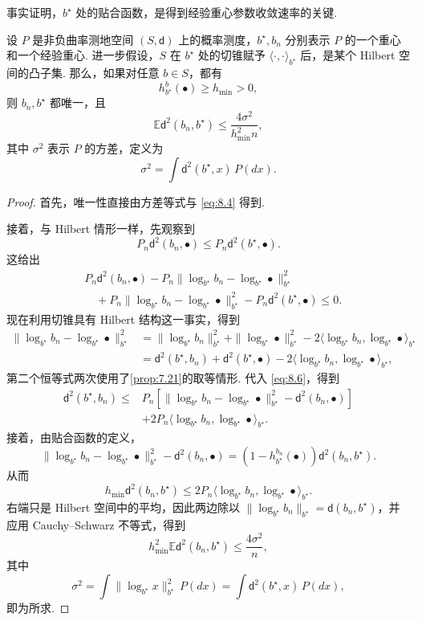 事实证明，$b^\star$ 处的贴合函数，是得到经验重心参数收敛速率的关键.
\begin{theorem}[主定理]\label{thm:8.5}
设 $P$ 是非负曲率测地空间 $(S,\mathsf d)$ 上的概率测度，$b^\star,b_n$ 分别表示 $P$ 的一个重心和一个经验重心. 进一步假设，$S$ 在 $b^\star$ 处的切锥赋予 $\langle\cdot,\cdot\rangle_{b^\star}$ 后，是某个 Hilbert 空间的凸子集. 那么，如果对任意 $b\in S$，都有
\begin{equation}\label{eq:8.4}
h_{b^\star}^b(\bullet)\ge h_{\min}>0,
\end{equation}
则 $b_n,b^\star$ 都唯一，且
$$\mathbb E\mathsf d^2(b_n,b^\star)\le\frac{4\sigma^2}{h_{\min}^2n},$$
其中 $\sigma^2$ 表示 $P$ 的方差，定义为
\begin{equation}\label{eq:8.5}
\sigma^2=\int\mathsf d^2(b^\star,x)\,P(dx).
\end{equation}
\end{theorem}
\begin{proof}
首先，唯一性直接由方差等式与 \eqref{eq:8.4} 得到.

接着，与 Hilbert 情形一样，先观察到
$$P_n\mathsf d^2(b_n,\bullet)\le P_n\mathsf d^2(b^\star,\bullet).$$
这给出
\begin{equation}\label{eq:8.6}
\begin{aligned}
&P_n\mathsf d^2(b_n,\bullet)-P_n\|\log_{b^\star}b_n-\log_{b^\star}\bullet\|_{b^\star}^2\\
&\quad+P_n\|\log_{b^\star}b_n-\log_{b^\star}\bullet\|_{b^\star}^2
-P_n\mathsf d^2(b^\star,\bullet)\le0.
\end{aligned}
\end{equation}
现在利用切锥具有 Hilbert 结构这一事实，得到
$$\begin{aligned}
\|\log_{b^\star}b_n-\log_{b^\star}\bullet\|_{b^\star}^2
&=\|\log_{b^\star}b_n\|_{b^\star}^2+\|\log_{b^\star}\bullet\|_{b^\star}^2
-2\langle\log_{b^\star}b_n,\log_{b^\star}\bullet\rangle_{b^\star}\\
&=\mathsf d^2(b^\star,b_n)+\mathsf d^2(b^\star,\bullet)
-2\langle\log_{b^\star}b_n,\log_{b^\star}\bullet\rangle_{b^\star},
\end{aligned}$$
第二个恒等式两次使用了\autoref{prop:7.21}的取等情形. 代入 \eqref{eq:8.6}，得到
$$\begin{aligned}
\mathsf d^2(b^\star,b_n)\le{}&P_n[\|\log_{b^\star}b_n-\log_{b^\star}\bullet\|_{b^\star}^2
-\mathsf d^2(b_n,\bullet)]\\
&+2P_n\langle\log_{b^\star}b_n,\log_{b^\star}\bullet\rangle_{b^\star}.
\end{aligned}$$
接着，由贴合函数的定义，
$$\|\log_{b^\star}b_n-\log_{b^\star}\bullet\|_{b^\star}^2-\mathsf d^2(b_n,\bullet)
=(1-h_{b^\star}^{b_n}(\bullet))\mathsf d^2(b_n,b^\star).$$
从而
$$h_{\min}\mathsf d^2(b_n,b^\star)
\le2P_n\langle\log_{b^\star}b_n,\log_{b^\star}\bullet\rangle_{b^\star}.$$
右端只是 Hilbert 空间中的平均，因此两边除以 $\|\log_{b^\star}b_n\|_{b^\star}=\mathsf d(b_n,b^\star)$，并应用 Cauchy--Schwarz 不等式，得到
$$h_{\min}^2\mathbb E\mathsf d^2(b_n,b^\star)\le\frac{4\sigma^2}n,$$
其中
$$\sigma^2=\int\|\log_{b^\star}x\|_{b^\star}^2\,P(dx)
=\int\mathsf d^2(b^\star,x)\,P(dx),$$
即为所求.
\end{proof}


